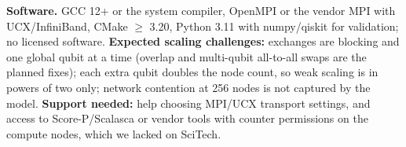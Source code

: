 \documentclass[10pt,a4paper]{article}
\begin{document}
\textbf{Software.} GCC 12+ or the system compiler, OpenMPI or the vendor MPI with UCX/InfiniBand, CMake $\ge$ 3.20, Python 3.11 with numpy/qiskit for validation; no licensed software. \textbf{Expected scaling challenges:} exchanges are blocking and one global qubit at a time (overlap and multi-qubit all-to-all swaps are the planned fixes); each extra qubit doubles the node count, so weak scaling is in powers of two only; network contention at 256 nodes is not captured by the model. \textbf{Support needed:} help choosing MPI/UCX transport settings, and access to Score-P/Scalasca or vendor tools with counter permissions on the compute nodes, which we lacked on SciTech.
\end{document}
